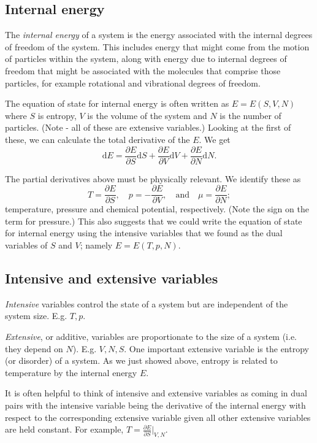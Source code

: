 \subsection{Internal energy}
The \emph{internal energy} of a system is the energy associated with the internal degrees of freedom of the system. This includes energy that might come from the motion of particles within the system, along with energy due to internal degrees of freedom that might be associated with the molecules that comprise those particles, for example rotational and vibrational degrees of freedom. 

The equation of state for internal energy is often written as $E = E(S,V,N)$ where $S$ is entropy, $V$ is the volume of the system and $N$ is the number of particles. (Note - all of these are extensive variables.)
Looking at the first of these, we can calculate the total derivative of the $E$. We get
$$
	\mathrm{d}E = \frac{\partial E}{\partial S}\mathrm{d}S +  \frac{\partial E}{\partial V}\mathrm{d}V +  \frac{\partial E}{\partial N}\mathrm{d}N.  
$$

The partial derivatives above must be physically relevant. We identify these as 
$$
T =  \frac{\partial E}{\partial S}, \quad p = -\frac{\partial E}{\partial V},\quad \mbox{and}  \quad \mu = \frac{\partial E}{\partial N};
$$ 
temperature, pressure and chemical potential, respectively. (Note the sign on the term for pressure.) This also suggests that we could write the equation of state for internal energy using the intensive variables that we found as the dual variables of $S$ and $V$; namely $E = E(T,p,N)$.

\subsection{Intensive and extensive variables}

\emph{Intensive} variables control the state of a system but are independent of the system size. E.g. $T,p$.

\emph{Extensive}, or additive, variables are proportionate to the size of a system (i.e. they depend on $N$). E.g. $V,N,S$.
One important extensive variable is the entropy (or disorder) of a system. As we just showed above, entropy is related to temperature by the internal energy $E$.

It is often helpful to think of intensive and extensive variables as coming in dual pairs with the intensive variable being the derivative of the internal energy with respect to the corresponding extensive variable given all other extensive variables are held constant. For example, $T = \frac{\partial E}{\partial S}\vert_{V,N}$.


